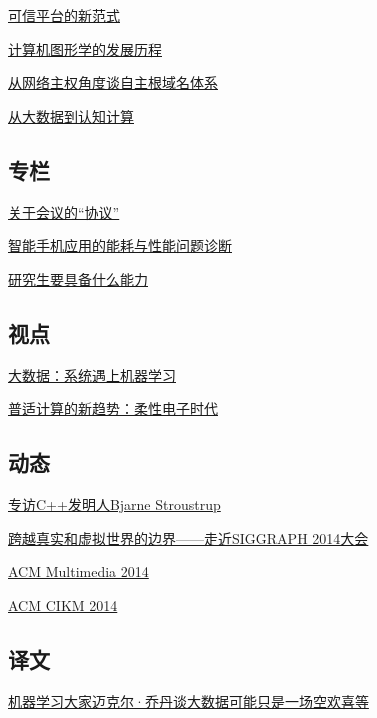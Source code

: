 \documentclass[a4paper]{article}
\begin{document}
\href{http://history.ccf.org.cn/resources/1190201776262/2014/12/11/7.pdf}{可信平台的新范式}

\href{http://history.ccf.org.cn/resources/1190201776262/2014/12/11/1.pdf}{计算机图形学的发展历程}

\href{http://history.ccf.org.cn/resources/1190201776262/2014/12/11/3.pdf}{从网络主权角度谈自主根域名体系}

\href{http://history.ccf.org.cn/resources/1190201776262/2014/12/11/5.pdf}{从大数据到认知计算}

\subsection{专栏}
\href{http://history.ccf.org.cn/resources/1190201776262/2014/12/11/10.pdf}{关于会议的“协议”}

\href{http://history.ccf.org.cn/resources/1190201776262/2014/12/11/8.pdf}{智能手机应用的能耗与性能问题诊断}

\href{http://history.ccf.org.cn/resources/1190201776262/2014/12/11/9.pdf}{研究生要具备什么能力}

\subsection{视点}
\href{http://history.ccf.org.cn/resources/1190201776262/2014/12/11/11.pdf}{大数据：系统遇上机器学习}

\href{http://history.ccf.org.cn/resources/1190201776262/2014/12/11/12.pdf}{普适计算的新趋势：柔性电子时代}

\subsection{动态}
\href{http://history.ccf.org.cn/resources/1190201776262/2014/12/11/13.pdf}{专访C++发明人Bjarne Stroustrup}

\href{http://history.ccf.org.cn/resources/1190201776262/2014/12/11/14.pdf}{跨越真实和虚拟世界的边界——走近SIGGRAPH 2014大会}

\href{http://history.ccf.org.cn/resources/1190201776262/2014/12/11/15.pdf}{ACM Multimedia 2014}

\href{http://history.ccf.org.cn/resources/1190201776262/2014/12/11/16.pdf}{ACM CIKM 2014}

\subsection{译文}
\href{http://history.ccf.org.cn/resources/1190201776262/2014/12/11/18.pdf}{机器学习大家迈克尔·乔丹谈大数据可能只是一场空欢喜等}
\end{document}
